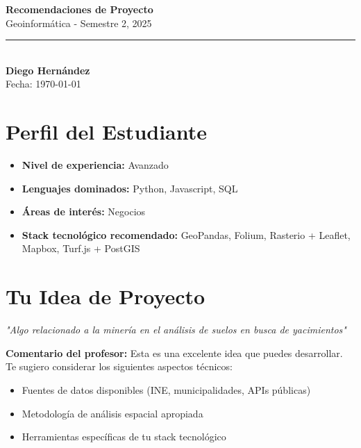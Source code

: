 \documentclass[11pt,a4paper]{article}
\begin{document}
\begin{center}
    {\Huge \textbf{Recomendaciones de Proyecto}}\\[0.5cm]
    {\Large \textcolor{usachblue}{Geoinformática - Semestre 2, 2025}}\\[0.3cm]
    \rule{\textwidth}{0.5pt}\\[0.3cm]
    {\LARGE \textbf{Diego Hernández}}\\[0.2cm]
    {\large Fecha: \today}
\end{center}

\vspace{0.5cm}

\section*{ Perfil del Estudiante}

\begin{tcolorbox}[colback=blue!5,colframe=usachblue,title=Resumen de tu Perfil]
\begin{itemize}[leftmargin=*]
    \item \textbf{Nivel de experiencia:} Avanzado
    \item \textbf{Lenguajes dominados:} Python, Javascript, SQL
    \item \textbf{Áreas de interés:} Negocios
    \item \textbf{Stack tecnológico recomendado:} GeoPandas, Folium, Rasterio + Leaflet, Mapbox, Turf.js + PostGIS
\end{itemize}
\end{tcolorbox}


\section*{ Tu Idea de Proyecto}

\begin{tcolorbox}[colback=yellow!10,colframe=darkorange,title=Idea Original]
\textit{"Algo relacionado a la minería en el análisis de suelos en busca de yacimientos"}

\vspace{0.3cm}
\textbf{Comentario del profesor:} Esta es una excelente idea que puedes desarrollar. Te sugiero considerar los siguientes aspectos técnicos:
\begin{itemize}
    \item Fuentes de datos disponibles (INE, municipalidades, APIs públicas)
    \item Metodología de análisis espacial apropiada
    \item Herramientas específicas de tu stack tecnológico
\end{itemize}
\end{tcolorbox}
\end{document}
